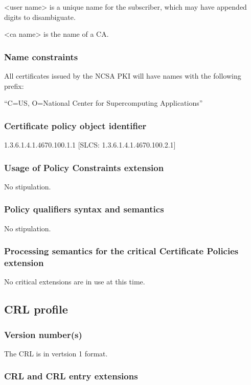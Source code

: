 \documentclass[10pt]{article}
\begin{document}
 <user name> is a unique name for the subscriber, which may have
 appended digits to disambiguate.

 <ca name> is the name of a CA.

\subsubsection{Name constraints}

All certificates issued by the NCSA PKI will have names with the
following prefix:

``C=US, O=National Center for Supercomputing Applications''

\subsubsection{Certificate policy object identifier}

1.3.6.1.4.1.4670.100.1.1
[SLCS: 1.3.6.1.4.1.4670.100.2.1]

\subsubsection{Usage of Policy Constraints extension}

No stipulation.

\subsubsection{Policy qualifiers syntax and semantics}

No stipulation.

\subsubsection{Processing semantics for the critical Certificate Policies extension}

No critical extensions are in use at this time.

\subsection{CRL profile}
\subsubsection{Version number(s)}

The CRL is in vertsion 1 format.

\subsubsection{CRL and CRL entry extensions}
\end{document}
